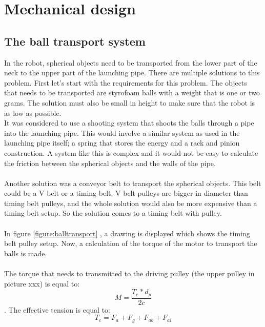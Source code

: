 \documentclass[11pt,twoside,a4paper]{report}
\begin{document}
\section{Mechanical design}

\subsection{The ball transport system}
In the robot, spherical objects need to be transported from the lower part of the neck to the upper part of the launching pipe. There are multiple solutions to this problem. First let\rq{}s start with the requirements for this problem. The objects that needs to be transported are styrofoam balls with a weight that is one or two grams. The solution must also be small in height to make sure that the robot is as low as possible.  \\
It was considered to use a shooting system that shoots the balls through a pipe into the launching pipe. This would involve a similar system as used in the launching pipe itself; a spring that stores the energy and a rack and pinion construction. A system like this is complex and it would not be easy to calculate the friction between the spherical objects and the walls of the pipe.\\
\\
Another solution was a conveyor belt to transport the spherical objects. This belt could be a V belt or a timing belt. V belt pulleys are bigger in diameter than timing belt pulleys, and the whole solution would also be more expensive than a timing belt setup. So the solution comes to a timing belt with pulley.\\
\\
In figure \ref{figure:balltransport} , a drawing is displayed which shows the timing belt pulley setup. Now, a calculation of the torque of the motor to transport the balls is made.\\
\\The torque that needs to transmitted to the driving pulley (the upper pulley in picture xxx) is equal to: \[M=\frac{T_{e}*d_{p}}{2c}  \].
The effective tension is equal to:
\[T_{e}=F_{a}+F_{g}+F_{ab}+F_{ai}  \]
\end{document}

